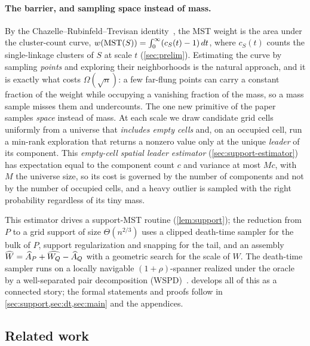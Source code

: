 \paragraph{The barrier, and sampling space instead of mass.}
By the Chazelle--Rubinfeld--Trevisan identity~\cite{CRT05}, the MST weight is the area under the
cluster-count curve, $w(\mathrm{MST}(S))=\int_0^\infty(c_S(t)-1)\,dt$, where $c_S(t)$ counts the single-linkage
clusters of $S$ at scale $t$ (\cref{sec:prelim}). Estimating the curve by sampling \emph{points} and
exploring their neighborhoods is the natural approach, and it is exactly what costs $\Omega(\sqrt n)$: a
few far-flung points can carry a constant fraction of the weight while occupying a vanishing fraction of
the mass, so a mass sample misses them and undercounts. The one new primitive of the paper samples
\emph{space} instead of mass. At each scale we draw candidate grid cells uniformly from a universe that
\emph{includes empty cells} and, on an occupied cell, run a min-rank exploration that returns a nonzero
value only at the unique \emph{leader} of its component. This \emph{empty-cell spatial leader estimator}
(\cref{sec:support-estimator}) has expectation equal to the component count $c$ and variance at most $Mc$,
with $M$ the universe size, so its cost is governed by the number of components and not by the number of
occupied cells, and a heavy outlier is sampled with the right probability regardless of its tiny mass.

This estimator drives a support-MST routine (\cref{lem:support}); the reduction from $P$ to a grid support
of size $\Theta(n^{2/3})$ uses a clipped death-time sampler for the bulk of $P$, support regularization
and snapping for the tail, and an assembly $\widehat W=\widehat A_P+\widehat{W_Q}-\widehat A_Q$ with a
geometric search for the scale of $W$. The death-time sampler runs on a locally navigable
$(1+\rho)$-spanner realized under the oracle by a well-separated pair decomposition (WSPD)~\cite{CK95,HarPeled11}.
 develops all of this as a connected story; the formal statements and proofs follow in
\cref{sec:support,sec:dt,sec:main} and the appendices.

\subsection{Related work}\label{sec:intro-related}

